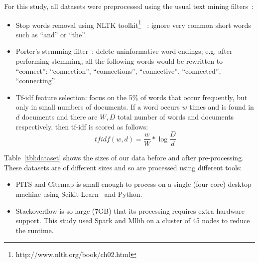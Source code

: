 \documentclass[twocolumn,5p,sort&compress]{elsarticle}
\newcommand{\bi}{\begin{itemize}}
\newcommand{\ei}{\end{itemize}}
\theoremstyle{break}
\begin{document}
  For this study, all  datasets were preprocessed using the usual text mining filters~\cite{feldman2006j}:
\bi
\item
  Stop words removal using NLTK toolkit\footnote{http://www.nltk.org/book/ch02.html}~\cite{bird2006nltk} : ignore very common short words such as  ``and'' or ``the''.
\item
  Porter's stemming filter~\cite{Porter1980}: delete uninformative word endings; e.g. after performing stemming, all the following words would be rewritten
  to ``connect'': ``connection'', ``connections'',
``connective'',          
``connected'',
  ``connecting''.
\item
  Tf-idf feature selection: focus on the 5\% of words that occur frequently,
  but only in small numbers of documents. If a word occurs $w$ times
  and is found in $d$ documents  and there
  are $W,D$ total number of words and documents respectively, then tf-idf is scored
  as follows:
  \[
  \mathit{tfidf}(w,d)=   \frac{w}{W} *\log{\frac{D}{d}}\]
  \ei

  Table~\ref{tbl:dataset} shows the sizes of our data before and after pre-processing.
  These datasets are of different sizes and so are processed using different tools:
  \bi
\item PITS and Citemap is small enough to process on a single (four core) desktop machine
  using Scikit-Learn~\cite{pedregosa2011scikit} and Python.
  \item Stackoverflow is so large (7GB) that its  processing requires extra hardware support.
 This study used Spark and Mllib on a cluster of 45 nodes to
 reduce the runtime.
 \ei
  
\end{document}
